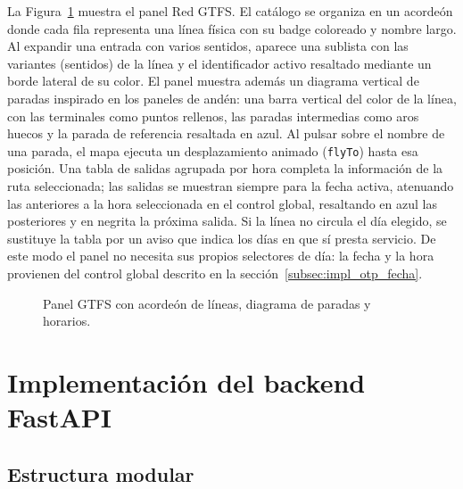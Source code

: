 La Figura~\ref{fig:gtfs_paradas} muestra el panel Red GTFS. El catálogo se organiza en un acordeón donde cada fila representa una línea física con su badge coloreado y nombre largo. Al expandir una entrada con varios sentidos, aparece una sublista con las variantes (sentidos) de la línea y el identificador activo resaltado mediante un borde lateral de su color. El panel muestra además un diagrama vertical de paradas inspirado en los paneles de andén: una barra vertical del color de la línea, con las terminales como puntos rellenos, las paradas intermedias como aros huecos y la parada de referencia resaltada en azul. Al pulsar sobre el nombre de una parada, el mapa ejecuta un desplazamiento animado (\texttt{flyTo}) hasta esa posición. Una tabla de salidas agrupada por hora completa la información de la ruta seleccionada; las salidas se muestran siempre para la fecha activa, atenuando las anteriores a la hora seleccionada en el control global, resaltando en azul las posteriores y en negrita la próxima salida. Si la línea no circula el día elegido, se sustituye la tabla por un aviso que indica los días en que sí presta servicio. De este modo el panel no necesita sus propios selectores de día: la fecha y la hora provienen del control global descrito en la sección~\ref{subsec:impl_otp_fecha}.



\begin{figure}[H]
  \centering
  \caption{Panel GTFS con acordeón de líneas, diagrama de paradas y horarios.}
  \label{fig:gtfs_paradas}
\end{figure}

\section{Implementación del backend FastAPI}
\label{sec:impl_backend}

\subsection{Estructura modular}
\label{subsec:impl_backend_estructura}

